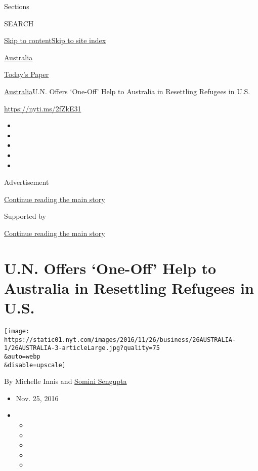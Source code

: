 Sections

SEARCH

\protect\hyperlink{site-content}{Skip to
content}\protect\hyperlink{site-index}{Skip to site index}

\href{https://www.nytimes.com/section/world/australia}{Australia}

\href{https://myaccount.nytimes.com/auth/login?response_type=cookie\&client_id=vi}{}

\href{https://www.nytimes.com/section/todayspaper}{Today's Paper}

\href{/section/world/australia}{Australia}\textbar{}U.N. Offers
`One-Off' Help to Australia in Resettling Refugees in U.S.

\url{https://nyti.ms/2fZkE31}

\begin{itemize}
\item
\item
\item
\item
\item
\end{itemize}

Advertisement

\protect\hyperlink{after-top}{Continue reading the main story}

Supported by

\protect\hyperlink{after-sponsor}{Continue reading the main story}

\hypertarget{un-offers-one-off-help-to-australia-in-resettling-refugees-in-us}{%
\section{U.N. Offers `One-Off' Help to Australia in Resettling Refugees
in
U.S.}\label{un-offers-one-off-help-to-australia-in-resettling-refugees-in-us}}

\texttt{[image: https://static01.nyt.com/images/2016/11/26/business/26AUSTRALIA-1/26AUSTRALIA-3-articleLarge.jpg?quality=75\\\&auto=webp\\\&disable=upscale]}

By Michelle Innis and
\href{http://www.nytimes.com/by/somini-sengupta}{Somini Sengupta}

\begin{itemize}
\item
  Nov. 25, 2016
\item
  \begin{itemize}
  \item
  \item
  \item
  \item
  \item
  \end{itemize}
\end{itemize}


